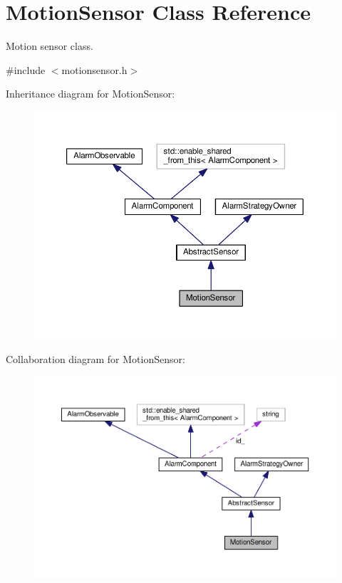 \hypertarget{classMotionSensor}{}\section{Motion\+Sensor Class Reference}
\label{classMotionSensor}


Motion sensor class.  




{\ttfamily \#include $<$motionsensor.\+h$>$}



Inheritance diagram for Motion\+Sensor\+:\nopagebreak
\begin{figure}[H]
\begin{center}
\leavevmode
\includegraphics[width=350pt]{classMotionSensor__inherit__graph}
\end{center}
\end{figure}


Collaboration diagram for Motion\+Sensor\+:\nopagebreak
\begin{figure}[H]
\begin{center}
\leavevmode
\includegraphics[width=350pt]{classMotionSensor__coll__graph}
\end{center}
\end{figure}
